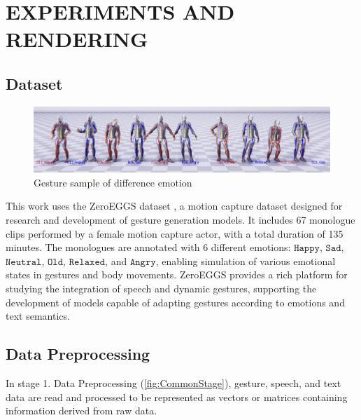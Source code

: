 
\section{EXPERIMENTS AND RENDERING}
\label{sec:results}


\subsection{Dataset}


\begin{figure}[H]
	\centering
	\includegraphics[width=\linewidth]{images/DifferenceEmotion}
	\caption{Gesture sample of difference emotion}
\end{figure}

This work uses the ZeroEGGS dataset \cite{ghorbani2022zeroeggszeroshotexamplebasedgesture}, a motion capture dataset designed for research and development of gesture generation models. It includes 67 monologue clips performed by a female motion capture actor, with a total duration of 135 minutes. The monologues are annotated with 6 different emotions: $\texttt{Happy}$, $\texttt{Sad}$, $\texttt{Neutral}$, $\texttt{Old}$, $\texttt{Relaxed}$, and $\texttt{Angry}$, enabling simulation of various emotional states in gestures and body movements. ZeroEGGS provides a rich platform for studying the integration of speech and dynamic gestures, supporting the development of models capable of adapting gestures according to emotions and text semantics.

\subsection{Data Preprocessing}
\label{sec:Preprocessing}

In stage {1. Data Preprocessing} (\autoref{fig:CommonStage}), gesture, speech, and text data are read and processed to be represented as vectors or matrices containing information derived from raw data.

